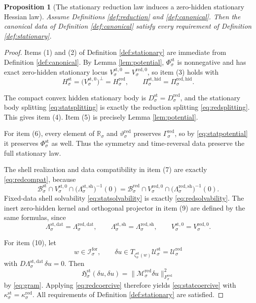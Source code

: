 \documentclass[11pt]{article}
\newcommand{\ForSpace}[1]{\mathcal I_{#1}^{\mathrm{for}}}
\newcommand{\StatSpace}[1]{\mathcal U_{#1}^{\mathrm{st}}}
\newcommand{\StatBody}[1]{\mathcal B_{#1}^{\mathrm{st}}}
\newcommand{\StatData}[1]{\Lambda_{#1}^{\mathrm{st,dat}}}
\newcommand{\StatShell}[1]{\Lambda_{#1}^{\mathrm{st,sh}}}
\newcommand{\StatPotential}[1]{\Phi_{#1}^{\mathrm{st}}}
\newcommand{\StatZero}[1]{V_{#1}^{\mathrm{st},0}}
\newcommand{\StatHidden}[1]{H_{#1}^{\mathrm{st}}}
\newcommand{\StatHiddenBody}[1]{D_{#1}^{\mathrm{st}}}
\newcommand{\StatProj}[1]{\Pi_{#1}^{\mathrm{st,hid}}}
\newcommand{\StatHess}[1]{\mathfrak H_{#1}^{\mathrm{st}}}
\newcommand{\StatEmbed}[1]{\zeta_{#1}^{\mathrm{st}}}
\newcommand{\RedSpace}[1]{\mathcal U_{#1}^{\mathrm{red}}}
\newcommand{\RedBody}[1]{\mathcal B_{#1}^{\mathrm{red}}}
\newcommand{\RedData}[1]{\Lambda_{#1}^{\mathrm{red,dat}}}
\newcommand{\RedShell}[1]{\Lambda_{#1}^{\mathrm{red,sh}}}
\newcommand{\RedTarget}[1]{F_{#1}^{\mathrm{red}}}
\newcommand{\RedMap}[1]{\Gamma_{#1}^{\mathrm{red}}}
\newcommand{\RedZero}[1]{V_{#1}^{\mathrm{red},0}}
\newcommand{\RedHidden}[1]{H_{#1}^{\mathrm{red}}}
\newcommand{\RedHiddenBody}[1]{D_{#1}^{\mathrm{red}}}
\newcommand{\RedProj}[1]{\Pi_{#1}^{\mathrm{red,hid}}}
\newcommand{\RedLin}[1]{\mathcal M_{#1}^{\mathrm{red}}}
\newcommand{\RedSym}[1]{\mathbb R_{#1}}
\newcommand{\RedTime}[1]{\vartheta_{#1}^{\mathrm{red}}}
\newtheorem{proposition}{Proposition}
\begin{document}
\begin{proposition}[The stationary reduction law induces a zero-hidden stationary Hessian law]
\label{prop:stationary}
Assume Definitions \ref{def:reduction} and \ref{def:canonical}. Then the canonical data of Definition \ref{def:canonical} satisfy every requirement of Definition \ref{def:stationary}.
\end{proposition}

\begin{proof}
Items (1) and (2) of Definition \ref{def:stationary} are immediate from Definition \ref{def:canonical}. By Lemma \ref{lem:potential}, \(\StatPotential{\sigma}\) is nonnegative and has exact zero-hidden stationary locus \(\StatZero{\sigma}=\RedZero{\sigma}\), so item (3) holds with
\[
\StatHidden{\sigma}
=
\bigl(\StatZero{\sigma}\bigr)^{\perp}
=
\RedHidden{\sigma},
\qquad
\StatProj{\sigma}=\RedProj{\sigma}.
\]

The compact convex hidden stationary body is \(\StatHiddenBody{\sigma}=\RedHiddenBody{\sigma}\), and the stationary body splitting \eqref{eq:statsplitting} is exactly the reduction splitting \eqref{eq:redsplitting}. This gives item (4). Item (5) is precisely Lemma \ref{lem:potential}.

For item (6), every element of \(\RedSym{\sigma}\) and \(\RedTime{\sigma}\) preserves \(\RedMap{\sigma}\), so by \eqref{eq:statpotential} it preserves \(\StatPotential{\sigma}\) as well. Thus the symmetry and time-reversal data preserve the full stationary law.

The shell realization and data compatibility in item (7) are exactly \eqref{eq:redcompat}, because
\[
\StatBody{\sigma}\cap\StatZero{\sigma}\cap\bigl(\StatShell{\sigma}\bigr)^{-1}(0)
=
\RedBody{\sigma}\cap\RedZero{\sigma}\cap\bigl(\RedShell{\sigma}\bigr)^{-1}(0).
\]
Fixed-data shell solvability \eqref{eq:statsolvability} is exactly \eqref{eq:redsolvability}. The inert zero-hidden kernel and orthogonal projector in item (9) are defined by the same formulas, since
\[
\StatData{\sigma}=\RedData{\sigma},
\qquad
\StatShell{\sigma}=\RedShell{\sigma},
\qquad
\StatZero{\sigma}=\RedZero{\sigma}.
\]

For item (10), let
\[
w\in\ForSpace{\sigma},
\qquad
\delta u\in T_{\StatEmbed{\sigma}(w)}\StatSpace{\sigma}=\RedSpace{\sigma}
\]
with \(D\StatData{\sigma}\,\delta u=0\). Then
\[
\StatHess{\sigma}(\delta u,\delta u)
=
\|\RedLin{\sigma}\delta u\|_{\RedTarget{\sigma}}^{2}
\]
by \eqref{eq:gram}. Applying \eqref{eq:redcoercive} therefore yields \eqref{eq:statcoercive} with \(\kappa_{\sigma}^{\mathrm{st}}=\kappa_{\sigma}^{\mathrm{red}}\). All requirements of Definition \ref{def:stationary} are satisfied.
\end{proof}
\end{document}
